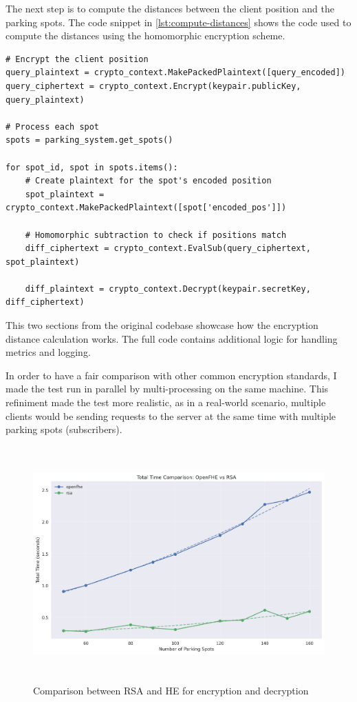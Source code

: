 The next step is to compute the distances between the client position and the parking spots. The code snippet in \cref{lst:compute-distances} shows the code used to compute the distances using the homomorphic encryption scheme.

\begin{lstlisting}[caption={Computing distances using Homomorphic Encryption}, label={lst:compute-distances}]
# Encrypt the client position
query_plaintext = crypto_context.MakePackedPlaintext([query_encoded])
query_ciphertext = crypto_context.Encrypt(keypair.publicKey, query_plaintext)

# Process each spot
spots = parking_system.get_spots()

for spot_id, spot in spots.items():
    # Create plaintext for the spot's encoded position
    spot_plaintext = crypto_context.MakePackedPlaintext([spot['encoded_pos']])
    
    # Homomorphic subtraction to check if positions match
    diff_ciphertext = crypto_context.EvalSub(query_ciphertext, spot_plaintext)
                
    diff_plaintext = crypto_context.Decrypt(keypair.secretKey, diff_ciphertext)

\end{lstlisting}

This two sections from the original codebase showcase how the encryption distance calculation works. The full code contains additional logic for handling metrics and logging.

In order to have a fair comparison with other common encryption standards, I made the test run in parallel by multi-processing on the same machine. This refiniment made the test more realistic, as in a real-world scenario, multiple clients would be sending requests to the server at the same time with multiple parking spots (subscribers).

\begin{figure}[h]
    \centering
    \includegraphics[width=12.5cm,height=9cm]{img/total_time_comparison.png}
    \caption{Comparison between RSA and HE for encryption and decryption}
    \label{fig:he-vs-rsa}
\end{figure}


